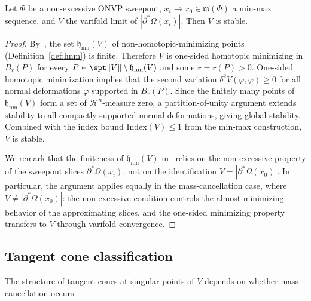 \begin{proposition}\label{prop:stability}
Let $\Phi$ be a non-excessive ONVP sweepout, $x_i \to x_0 \in \mathfrak{m}(\Phi)$ a min-max sequence, and $V$ the varifold limit of $|\partial^*\Omega(x_i)|$. Then $V$ is stable.
\end{proposition}

\begin{proof}
By~\cite[Proposition~3.1]{CLS22}, the set $\mathfrak{h}_{\mathrm{nm}}(V)$ of non-homotopic-minimizing points (Definition~\ref{def:hnm}) is finite. Therefore $V$ is one-sided homotopic minimizing in $B_r(P)$ for every $P \in \spt\|V\| \setminus \mathfrak{h}_{\mathrm{nm}}(V)$ and some $r = r(P) > 0$. One-sided homotopic minimization implies that the second variation $\delta^2 V(\varphi, \varphi) \geq 0$ for all normal deformations $\varphi$ supported in $B_r(P)$. Since the finitely many points of $\mathfrak{h}_{\mathrm{nm}}(V)$ form a set of $\mathcal{H}^n$-measure zero, a partition-of-unity argument extends stability to all compactly supported normal deformations, giving global stability. Combined with the index bound $\mathrm{Index}(V) \leq 1$ from the min-max construction, $V$ is stable.

We remark that the finiteness of $\mathfrak{h}_{\mathrm{nm}}(V)$ in~\cite[Proposition~3.1]{CLS22} relies on the non-excessive property of the sweepout slices $\partial^*\Omega(x_i)$, not on the identification $V = |\partial^*\Omega(x_0)|$. In particular, the argument applies equally in the mass-cancellation case, where $V \neq |\partial^*\Omega(x_0)|$: the non-excessive condition controls the almost-minimizing behavior of the approximating slices, and the one-sided minimizing property transfers to $V$ through varifold convergence.
\end{proof}

\subsection{Tangent cone classification}\label{subsec:tangent-cones}

The structure of tangent cones at singular points of $V$ depends on whether mass cancellation occurs.

